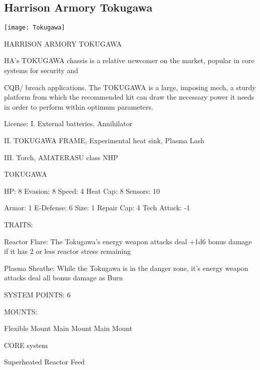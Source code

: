 \subsection{Harrison Armory Tokugawa}

\begin{center}
    \texttt{[image: Tokugawa]}
\end{center}

                             HARRISON ARMORY TOKUGAWA

HA’s TOKUGAWA chassis is a relative newcomer on the market, popular in core systems for security and

CQB/ breach applications. The TOKUGAWA is a large, imposing mech, a sturdy platform from which the
recommended kit can draw the necessary power it needs in order to perform within optimum parameters.

                                                  License:
I. External batteries, Annihilator

II. TOKUGAWA FRAME, Experimental heat sink, Plasma Lash

III. Torch, AMATERASU class NHP





                                                    TOKUGAWA

  HP: 8            Evasion: 8                              Speed: 4             Heat Cap: 8         Sensors: 10

  Armor: 1         E-Defense: 6                            Size: 1              Repair Cap: 4       Tech Attack: -1

                                                        TRAITS:

  Reactor Flare: The Tokugawa’s energy weapon attacks deal +1d6 bonus damage if it has 2 or less
  reactor stress remaining

  Plasma Sheathe: While the Tokugawa is in the danger zone, it’s energy weapon attacks deal all bonus
  damage as Burn

                                                 SYSTEM POINTS: 6

                                                       MOUNTS:

  Flexible Mount                       Main Mount                               Main Mount

                                                    CORE system

                                             Superheated Reactor Feed

